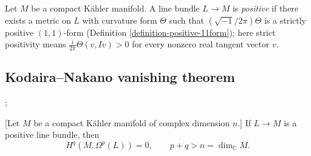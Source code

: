 \begin{definition}
\label{definition-positive-line-bundle}
\begin{reference}
\cite[p. 148]{gri}
\end{reference}
Let $M$ be a compact Kähler manifold.
A line bundle $L \to M$ is {\it positive}
if there exists a metric on $L$ with
curvature form $\Theta$
such that $(\sqrt{-1}/2\pi)\Theta$ is a
strictly positive $(1,1)$-form
(Definition
\ref{definition-positive-11form}); here
strict positivity means
$
\frac{i}{2\pi}\Theta(v,Iv)>0
$
for every nonzero real tangent vector $v$.
\end{definition}

\subsection{Kodaira--Nakano vanishing
theorem}
\label{subsection-kodaira-nakano-vanishing}

\begin{theorem}
\label{theorem-kodaira-nakano-vanishing}
\begin{reference}
\cite[p. 154]{gri};
\cite[Proposition 5.2.2]{huc}
\end{reference}
[Let $M$ be a compact Kähler manifold of
complex dimension $n$.]
If $L \to M$ is a positive line bundle,
then
$$
H^q(M,\Omega^p(L)) = 0,\qquad
p+q>n=\dim_\mathbb{C} M.
$$
\end{theorem}

